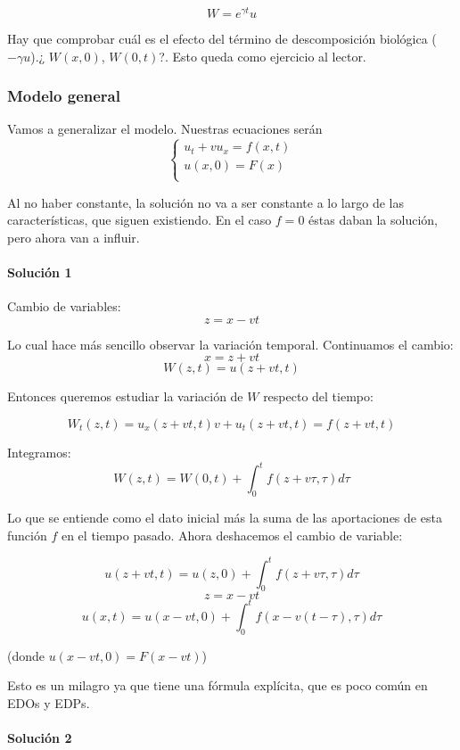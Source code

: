 		$$W = e^{\gamma t}u$$


		Hay que comprobar cuál es el efecto del término de descomposición biológica ($-\gamma u$).¿ $ W(x,0)$, $ W(0,t)$?. Esto queda como ejercicio al lector.


	\subsubsection{Modelo general}

		Vamos a generalizar el modelo. Nuestras ecuaciones serán \[
		\begin{cases}
		u_t + vu_x = f(x,t) \\
		u(x,0) = F(x) \\
		\end{cases} \]

		Al no haber constante, la solución no va a ser constante a lo largo de las características, que siguen existiendo. En el caso $f = 0$ éstas daban la solución, pero ahora van a influir.

		\paragraph{Solución 1}

			Cambio de variables:
			$$z = x-vt$$

			Lo cual hace más sencillo observar la variación temporal. Continuamos el cambio:
			$$x = z + vt$$
			$$W(z,t) = u(z+vt, t)$$

			Entonces queremos estudiar la variación de $W$ respecto del tiempo:

			$$W_t(z,t) = u_x(z + vt, t)v + u_t(z+vt, t) = f(z + vt, t)$$

			Integramos:
			$$W(z,t) = W(0,t) + \int^{t}_{0} f(z+v\tau, \tau) d\tau $$

			Lo que se entiende como el dato inicial más la suma de las aportaciones de esta función $f$ en el tiempo pasado. Ahora deshacemos el cambio de variable:

			$$u(z + vt, t) = u(z,0) + \int^{t}_{0} f(z+v\tau, \tau) d\tau$$
			$$z = x-vt$$
			$$u(x,t) = u(x-vt,0)+ \int^{t}_{0} f(x-v(t-\tau),\tau) d\tau$$

			(donde $u(x-vt,0) = F(x-vt)$)

			Esto es un milagro ya que tiene una fórmula explícita, que es poco común en EDOs y EDPs.

		\paragraph{Solución 2}

